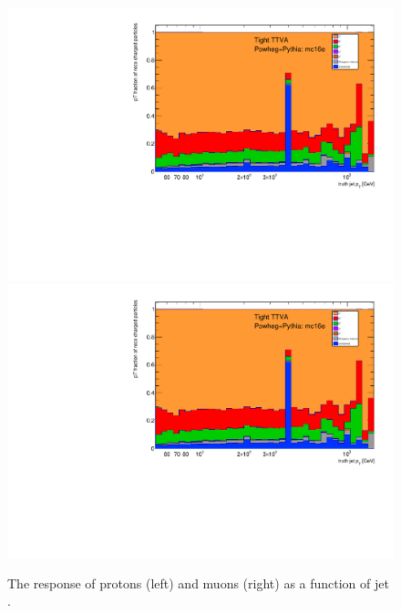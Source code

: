 \begin{figure}[b]
\centering
\includegraphics[scale=0.3, page=6]{figures/jet_comp_study_powheg_Tight_pTFraction_mc16e.pdf}
\includegraphics[scale=0.3, page=7]{figures/jet_comp_study_powheg_Tight_pTFraction_mc16e.pdf}
\caption {The response of protons (left) and muons (right) as a function of jet \pT.}
\label{fig:r_proton_muon}
\end{figure}

